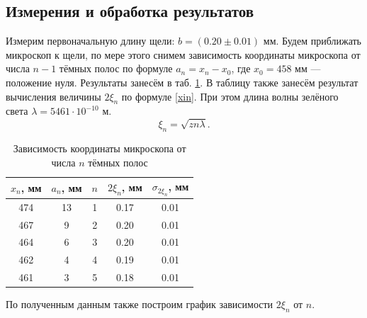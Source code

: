 \documentclass[a4paper,12pt]{article} %
\begin{document}
\subsection{Измерения и обработка результатов}

Измерим первоначальную длину щели: $ b = (0.20 \pm 0.01)$ мм. Будем приближать микроскоп к щели, по мере этого снимем зависимость координаты микроскопа от числа $ n - 1 $ тёмных полос по формуле $ a_n = x_n - x_0 $, где $ x_0 = 458 $ мм --- положение нуля. Результаты занесём в таб. \ref{table1}. В таблицу также занесём результат вычисления величины $ 2\xi_n $ по формуле \eqref{xin}. При этом длина волны зелёного света $ \lambda = 5461 \cdot 10^{-10} $ м. 
\begin{equation}
\xi_n = \sqrt{zn\lambda}.
\end{equation}


\begin{table}[H]
	\caption{Зависимость координаты микроскопа от числа $ n $ тёмных полос}
	\label{table1}	
	\begin{center}
		\begin{tabular}{|c|c|c|c|c|}
			\hline
			$ x_n $, мм  & $ a_n $, мм & $ n $& $ 2\xi_n $, мм& $ \sigma_{2\xi_n} $, мм\\
			\hline
			474 &	13	&	1   & 0.17  & 0.01
			\\ \hline
			467	&	9	&	2   & 0.20  & 0.01
			\\ \hline
			464	&	6	&	3   & 0.20  & 0.01
			\\ \hline
			462	& 	4	&	4   & 0.19  & 0.01
			\\ \hline
			461	&	3	&	5   & 0.18  & 0.01	\\
			\hline
		\end{tabular}
	\end{center}

\end{table}

По полученным данным также построим график зависимости $ 2\xi_n $ от $ n $.

\begin{center}
\end{center}
\end{document}
